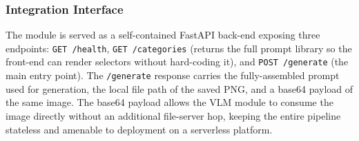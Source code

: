 \documentclass{article}
\begin{document}
\subsubsection{Integration Interface}
\label{sec:diffusion-api}

The module is served as a self-contained FastAPI back-end exposing
three endpoints: \texttt{GET /health}, \texttt{GET /categories} (returns
the full prompt library so the front-end can render selectors without
hard-coding it), and \texttt{POST /generate} (the main entry point).
The \texttt{/generate} response carries the fully-assembled prompt used
for generation, the local file path of the saved PNG, and a base64
payload of the same image. The base64 payload allows the VLM module to
consume the image directly without an additional file-server hop,
keeping the entire pipeline stateless and amenable to deployment on a
serverless platform.
\end{document}
